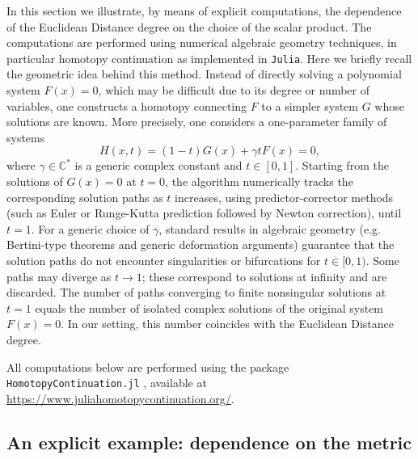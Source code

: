 \documentclass[11pt]{article}
\numberwithin{equation}{section}
\numberwithin{figure}{section}
\theoremstyle{plain}
\theoremstyle{definition}
\theoremstyle{remark}
\begin{document}
In this section we illustrate, by means of explicit computations, the dependence of the
Euclidean Distance degree on the choice of the scalar product.
The computations are performed using numerical algebraic geometry techniques,
in particular homotopy continuation as implemented in \texttt{Julia}. Here we briefly recall the geometric idea behind this method. Instead of directly solving a
polynomial system $F(x)=0$, which may be difficult due to its degree or number of variables, one constructs a homotopy
connecting $F$ to a simpler system $G$ whose solutions are known. More precisely, one considers a one-parameter family of systems
\[
H(x,t) = (1-t)G(x) + \gamma t F(x) = 0,
\]
where $\gamma\in\mathbb{C}^\ast$ is a generic complex constant and $t\in[0,1]$.
Starting from the solutions of $G(x)=0$ at $t=0$, the algorithm numerically tracks the
corresponding solution paths as $t$ increases, using predictor-corrector methods
(such as Euler or Runge-Kutta prediction followed by Newton correction), until $t=1$.
For a generic choice of $\gamma$, standard results in algebraic geometry
(e.g. Bertini-type theorems and generic deformation arguments) guarantee that the solution
paths do not encounter singularities or bifurcations for $t\in[0,1)$.
Some paths may diverge as $t\to1$; these correspond to solutions at infinity and are
discarded. The number of paths converging to finite nonsingular solutions at $t=1$
equals the number of isolated complex solutions of the original system $F(x)=0$.
In our setting, this number coincides with the Euclidean Distance degree.

All computations below are performed using the package
\texttt{HomotopyContinuation.jl} \cite{BrTi}, available at
\href{https://www.juliahomotopycontinuation.org/}{https://www.juliahomotopycontinuation.org/}.


\subsection{An explicit example: dependence on the metric}\label{sec:NumericalResults}
\end{document}
